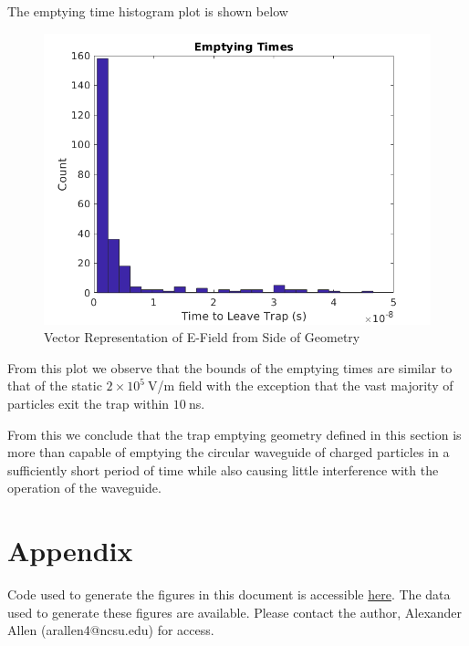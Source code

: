\documentclass[12pt,letterpaper]{article}
\begin{document}
The emptying time histogram plot is shown below

    \begin{figure}[H]
    \centering
    \includegraphics[width=0.7\linewidth]{img/emptying_mapped.png}
    \caption{Vector Representation of E-Field from Side of Geometry}
    \end{figure}
    
From this plot we observe that the bounds of the emptying times are similar to that of the static $2\times10^5~$V/m field with the exception that the vast majority of particles exit the trap within $10~$ns.

From this we conclude that the trap emptying geometry defined in this section is more than capable of emptying the circular waveguide of charged particles in a sufficiently short period of time while also causing little interference with the operation of the waveguide. 

\section{Appendix}

Code used to generate the figures in this document is accessible \href{https://github.com/robocoder99/CRES}{here}. The data used to generate these figures are available. Please contact the author, Alexander Allen (arallen4@ncsu.edu) for access. 
\end{document}
